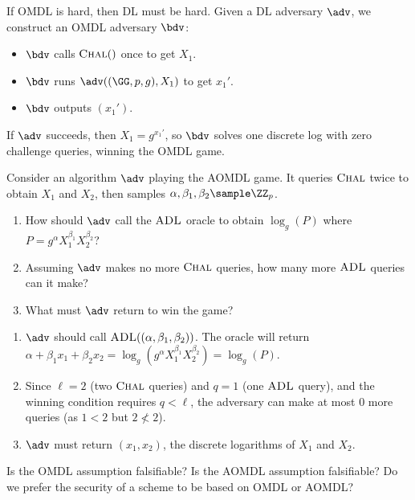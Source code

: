 \ifsolutions
\begin{mysolution}
  If OMDL is hard, then DL must be hard.
  Given a DL adversary $\adv$, we construct an OMDL adversary $\bdv$:
  \begin{itemize}
    \item $\bdv$ calls ${\normalfont\textsc{Chal}}()$ once to get $X_1$.
    \item $\bdv$ runs $\adv(\gparam, X_1)$ to get $x_1'$.
    \item $\bdv$ outputs $(x_1')$.
  \end{itemize}
  If $\adv$ succeeds, then $X_1 = g^{x_1'}$, so $\bdv$ solves one discrete log with zero challenge queries, winning the OMDL game.
\end{mysolution}
\fi

\begin{exercise}
  Consider an algorithm $\adv$ playing the AOMDL game. It queries ${\normalfont\textsc{Chal}}$ twice to obtain $X_1$ and $X_2$, then samples $\alpha, \beta_1, \beta_2 \sample \ZZ_p$. 
  \begin{enumerate}
    \item How should $\adv$ call the ${\normalfont\textsc{ADL}}$ oracle to obtain $\log_g(P)$ where $P = g^\alpha X_1^{\beta_1} X_2^{\beta_2}$?
    \item Assuming $\adv$ makes no more ${\normalfont\textsc{Chal}}$ queries, how many more ${\normalfont\textsc{ADL}}$ queries can it make?
    \item What must $\adv$ return to win the game?
  \end{enumerate}
\end{exercise}

\ifsolutions
\begin{mysolution}
  \begin{enumerate}
    \item $\adv$ should call ${\normalfont\textsc{ADL}}((\alpha, \beta_1, \beta_2))$. The oracle will return $\alpha + \beta_1 x_1 + \beta_2 x_2 = \log_g(g^\alpha X_1^{\beta_1} X_2^{\beta_2}) = \log_g(P)$.
    \item Since $\ell = 2$ (two ${\normalfont\textsc{Chal}}$ queries) and $q = 1$ (one ${\normalfont\textsc{ADL}}$ query), and the winning condition requires $q < \ell$, the adversary can make at most 0 more queries (as $1 < 2$ but $2 \not< 2$).
    \item $\adv$ must return $(x_1, x_2)$, the discrete logarithms of $X_1$ and $X_2$.
  \end{enumerate}
\end{mysolution}
\fi

\begin{exercise}
  Is the OMDL assumption falsifiable? Is the AOMDL assumption falsifiable? Do we prefer the security of a scheme to be based on OMDL or AOMDL?
\end{exercise}

